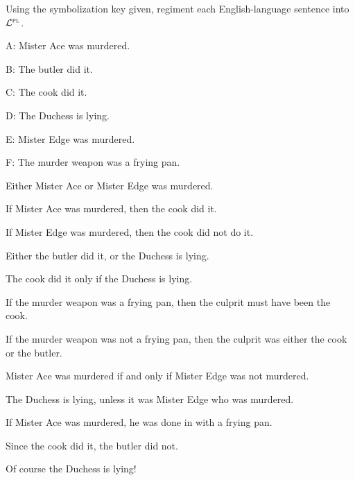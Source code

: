 \problempart Using the symbolization key given, regiment each English-language sentence into $\mathcal{L}^{\textsc{pl}}$.
\begin{ekey}
\item[A:] Mister Ace was murdered.
\item[B:] The butler did it.
\item[C:] The cook did it.
\item[D:] The Duchess is lying.
\item[E:] Mister Edge was murdered.
\item[F:] The murder weapon was a frying pan.
\end{ekey}
\begin{earg}
\item Either Mister Ace or Mister Edge was murdered.
\item If Mister Ace was murdered, then the cook did it.
\item If Mister Edge was murdered, then the cook did not do it.
\item Either the butler did it, or the Duchess is lying.
\item The cook did it only if the Duchess is lying.
\item If the murder weapon was a frying pan, then the culprit must have been the cook.
\item If the murder weapon was not a frying pan, then the culprit was either the cook or the butler.
\item Mister Ace was murdered if and only if Mister Edge was not murdered.
\item The Duchess is lying, unless it was Mister Edge who was murdered.
\item If Mister Ace was murdered, he was done in with a frying pan.
\item Since the cook did it, the butler did not.
\item Of course the Duchess is lying!
\end{earg}



